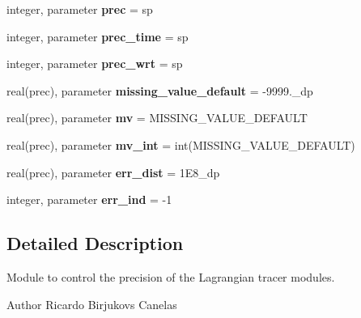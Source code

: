 \begin{DoxyCompactItemize}
integer, parameter {\bfseries prec} = sp
\item 
\mbox{\label{namespacetracer__precision_ab0488c4e5611f20cec04a8dd5136e399}} 
integer, parameter {\bfseries prec\+\_\+time} = sp
\item 
\mbox{\label{namespacetracer__precision_a32e0965432336112ebfe79971ed71f9a}} 
integer, parameter {\bfseries prec\+\_\+wrt} = sp
\item 
\mbox{\label{namespacetracer__precision_a6a8cf72ee06adcadccaead00f7c52886}} 
real(prec), parameter {\bfseries missing\+\_\+value\+\_\+default} = -\/9999.\+\_\+dp
\item 
\mbox{\label{namespacetracer__precision_a3246a92ef68908668cef8bb28dd607eb}} 
real(prec), parameter {\bfseries mv} = M\+I\+S\+S\+I\+N\+G\+\_\+\+V\+A\+L\+U\+E\+\_\+\+D\+E\+F\+A\+U\+LT
\item 
\mbox{\label{namespacetracer__precision_a4cd990219c131b02a273ad724bf350d1}} 
real(prec), parameter {\bfseries mv\+\_\+int} = int(M\+I\+S\+S\+I\+N\+G\+\_\+\+V\+A\+L\+U\+E\+\_\+\+D\+E\+F\+A\+U\+LT)
\item 
\mbox{\label{namespacetracer__precision_a502942a9490283f11daa6c7a871b1c79}} 
real(prec), parameter {\bfseries err\+\_\+dist} = 1\+E8\+\_\+dp
\item 
\mbox{\label{namespacetracer__precision_af62141148ede6b73b3c0c1bb89c22a2f}} 
integer, parameter {\bfseries err\+\_\+ind} = -\/1
\end{DoxyCompactItemize}


\subsection{Detailed Description}
Module to control the precision of the Lagrangian tracer modules. 

\begin{DoxyAuthor}{Author}
Ricardo Birjukovs Canelas 
\end{DoxyAuthor}

